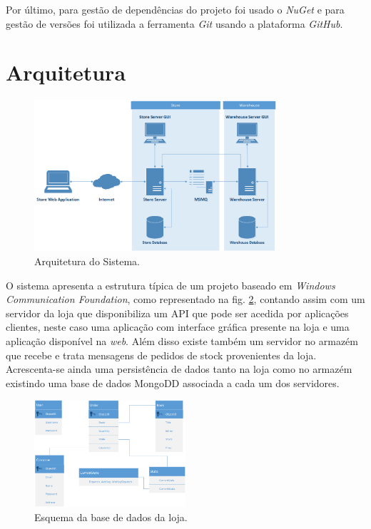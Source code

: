 \documentclass[12pt]{article}
\begin{document}
Por último, para gestão de dependências do projeto foi usado o \textit{NuGet} e para gestão de versões foi utilizada a ferramenta \textit{Git} usando a plataforma \textit{GitHub}.


\section{Arquitetura}

\begin{figure}[h!]
    \centering
    \includegraphics[width=0.8\textwidth]{arch.png}
    \caption{Arquitetura do Sistema.}
    \label{fig:arch}
\end{figure}

O sistema apresenta a estrutura típica de um projeto baseado em \textit{Windows Communication Foundation}, como representado na fig. \ref{fig:arch}, contando assim com um servidor da loja que disponibiliza um API que pode ser acedida por aplicações clientes, neste caso uma aplicação com interface gráfica presente na loja e uma aplicação disponível na \textit{web}. Além disso existe também um servidor no armazém que recebe e trata mensagens de pedidos de stock provenientes da loja. Acrescenta-se ainda uma persistência de dados tanto na loja como no armazém existindo uma base de dados MongoDD associada a cada um dos servidores.

\begin{figure}[h!]
    \centering
    \includegraphics[width=0.5\textwidth]{DBStore.png}
    \caption{Esquema da base de dados da loja.}
    \label{fig:arch}
\end{figure}
\end{document}
